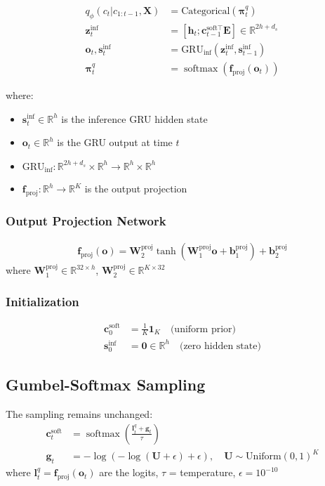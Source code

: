 \documentclass[11pt]{article}
\DeclareMathOperator{\softmax}{softmax}
\begin{document}
\begin{align}
q_\phi(c_t | c_{1:t-1}, \mathbf{X}) &= \text{Categorical}(\bm{\pi}_t^q) \\
\mathbf{z}_t^{\text{inf}} &= [\mathbf{h}_t; \mathbf{c}_{t-1}^{\text{soft}\top} \mathbf{E}] \in \mathbb{R}^{2h + d_s} \\
\mathbf{o}_t, \mathbf{s}_t^{\text{inf}} &= \text{GRU}_{\text{inf}}(\mathbf{z}_t^{\text{inf}}, \mathbf{s}_{t-1}^{\text{inf}}) \\
\bm{\pi}_t^q &= \softmax(\mathbf{f}_{\text{proj}}(\mathbf{o}_t))
\end{align}

where:
\begin{itemize}
\item $\mathbf{s}_t^{\text{inf}} \in \mathbb{R}^h$ is the inference GRU hidden state
\item $\mathbf{o}_t \in \mathbb{R}^h$ is the GRU output at time $t$
\item $\text{GRU}_{\text{inf}} : \mathbb{R}^{2h + d_s} \times \mathbb{R}^h \to \mathbb{R}^h \times \mathbb{R}^h$
\item $\mathbf{f}_{\text{proj}} : \mathbb{R}^h \to \mathbb{R}^K$ is the output projection
\end{itemize}

\subsubsection{Output Projection Network}
\begin{align}
\mathbf{f}_{\text{proj}}(\mathbf{o}) = \mathbf{W}_2^{\text{proj}} \tanh(\mathbf{W}_1^{\text{proj}} \mathbf{o} + \mathbf{b}_1^{\text{proj}}) + \mathbf{b}_2^{\text{proj}}
\end{align}
where $\mathbf{W}_1^{\text{proj}} \in \mathbb{R}^{32 \times h}$, $\mathbf{W}_2^{\text{proj}} \in \mathbb{R}^{K \times 32}$

\subsubsection{Initialization}
\begin{align}
\mathbf{c}_0^{\text{soft}} &= \frac{1}{K}\mathbf{1}_K \quad \text{(uniform prior)} \\
\mathbf{s}_0^{\text{inf}} &= \mathbf{0} \in \mathbb{R}^h \quad \text{(zero hidden state)}
\end{align}

\subsection{Gumbel-Softmax Sampling}
The sampling remains unchanged:
\begin{align}
\mathbf{c}_t^{\text{soft}} &= \softmax\left(\frac{\mathbf{l}_t^q + \mathbf{g}_t}{\tau}\right) \\
\mathbf{g}_t &= -\log(-\log(\mathbf{U} + \epsilon) + \epsilon), \quad \mathbf{U} \sim \text{Uniform}(0,1)^K
\end{align}
where $\mathbf{l}_t^q = \mathbf{f}_{\text{proj}}(\mathbf{o}_t)$ are the logits, $\tau$ = temperature, $\epsilon = 10^{-10}$
\end{document}
